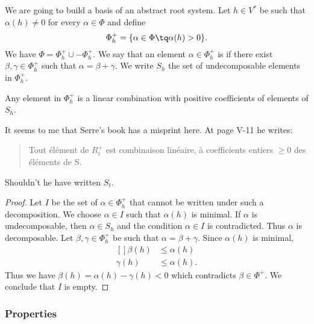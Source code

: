 We are going to build a basis of an abstract root system. Let \( h\in V^*\) be such that \( \alpha(h)\neq 0\) for every  \( \alpha\in\Phi\) and define
\begin{equation}
	\Phi_h^+=\{ \alpha\in\Phi\tq \alpha(h)>0 \}.
\end{equation}
We have \( \Phi=\Phi^+_h\cup -\Phi_h^+\). We say that an element \( \alpha\in\Phi^+_h\) is  if there exist \( \beta,\gamma\in\Phi_h^+\) such that \( \alpha=\beta+\gamma\). We write \( S_h\) the set of undecomposable elements in \( \Phi^+_h\).

\begin{lemma}       \label{LemShPhihpCBLSh}
	Any element in \( \Phi^+_h\) is a linear combination with positive coefficients of elements of \( S_h\).
\end{lemma}

\begin{probleme}
	It seems to me that Serre's book\cite{SerreSSAlgebres} has a misprint here. At page V-11 he writes:
	\begin{quote}
		Tout élément de \( R^+_t\) est combinaison linéaire, à coefficients entiers \( \geq 0\) des éléments de S.
	\end{quote}
	Shouldn't he have written \( S_t\).
\end{probleme}

\begin{proof}
	Let \( I\) be the set of \( \alpha\in\Phi^+_h\) that cannot be written under such a decomposition. We choose \( \alpha\in I\) such that \( \alpha(h)\) is minimal. If \( \alpha\) is undecomposable, then \( \alpha\in S_h\) and the condition \( \alpha\in I\) is contradicted. Thus \( \alpha\) is decomposable. Let \( \beta,\gamma\in\Phi^+_h\) be such that \( \alpha=\beta+\gamma\). Since \( \alpha(h)\) is minimal,
	\begin{equation}
		\begin{aligned}[]
			\beta(h)  & \leq \alpha(h)  \\
			\gamma(h) & \leq \alpha(h).
		\end{aligned}
	\end{equation}
	Thus we have \( \beta(h)=\alpha(h)-\gamma(h)<0\) which contradicts \( \beta\in\Phi^+\). We conclude that \( I\) is empty.
\end{proof}

\subsubsection{Properties}

